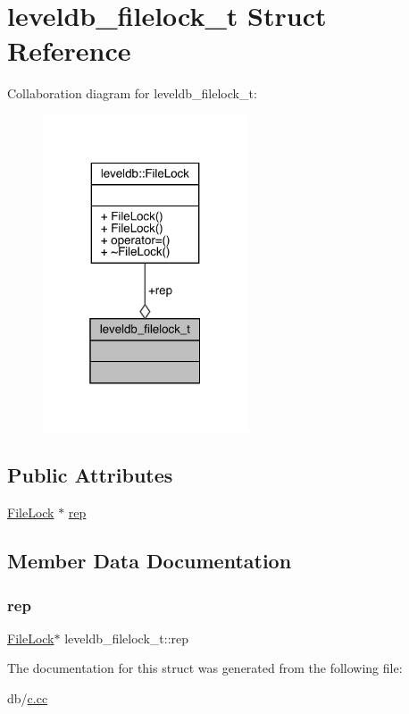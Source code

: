 \hypertarget{structleveldb__filelock__t}{}\section{leveldb\+\_\+filelock\+\_\+t Struct Reference}
\label{structleveldb__filelock__t}


Collaboration diagram for leveldb\+\_\+filelock\+\_\+t\+:
\nopagebreak
\begin{figure}[H]
\begin{center}
\leavevmode
\includegraphics[width=172pt]{structleveldb__filelock__t__coll__graph}
\end{center}
\end{figure}
\subsection*{Public Attributes}
\begin{DoxyCompactItemize}
\item 
\mbox{\hyperlink{classleveldb_1_1_file_lock}{File\+Lock}} $\ast$ \mbox{\hyperlink{structleveldb__filelock__t_a6c341dd7282427215e6b3ba47871a4f5}{rep}}
\end{DoxyCompactItemize}


\subsection{Member Data Documentation}
\mbox{\label{structleveldb__filelock__t_a6c341dd7282427215e6b3ba47871a4f5}} 
\subsubsection{\texorpdfstring{rep}{rep}}
{\footnotesize\ttfamily \mbox{\hyperlink{classleveldb_1_1_file_lock}{File\+Lock}}$\ast$ leveldb\+\_\+filelock\+\_\+t\+::rep}



The documentation for this struct was generated from the following file\+:\begin{DoxyCompactItemize}
\item 
db/\mbox{\hyperlink{c_8cc}{c.\+cc}}\end{DoxyCompactItemize}
